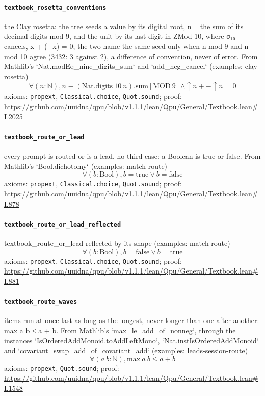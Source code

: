 \documentclass[11pt]{article}
\begin{document}
\paragraph{\texttt{textbook\_rosetta\_conventions}}
the Clay rosetta: the tree seeds a value by its digital root, n ≡ the sum of its decimal digits mod 9, and the unit by its last digit in ZMod 10, where σ₁₀ cancels, x + (−x) = 0; the two name the same seed only when n mod 9 and n mod 10 agree (3432: 3 against 2), a difference of convention, never of error. From Mathlib's `Nat.modEq\_nine\_digits\_sum` and `add\_neg\_cancel` (examples: clay-rosetta)
\[ \forall (n : \mathbb{N}), n \equiv (\mathrm{Nat.digits}\ 10\ n)\mathrm{.sum} [\mathrm{MOD}\ 9] \land \uparrow n + -\uparrow n = 0 \]
\noindent axioms: \texttt{propext}, \texttt{Classical.choice}, \texttt{Quot.sound}; proof: \url{https://github.com/uuidna/qpu/blob/v1.1.1/lean/Qpu/General/Textbook.lean\#L2025}

\paragraph{\texttt{textbook\_route\_or\_lead}}
every prompt is routed or is a lead, no third case: a Boolean is true or false. From Mathlib's `Bool.dichotomy` (examples: match-route)
\[ \forall (b : \mathrm{Bool}), b = \mathrm{true} \lor b = \mathrm{false} \]
\noindent axioms: \texttt{propext}, \texttt{Classical.choice}, \texttt{Quot.sound}; proof: \url{https://github.com/uuidna/qpu/blob/v1.1.1/lean/Qpu/General/Textbook.lean\#L878}

\paragraph{\texttt{textbook\_route\_or\_lead\_reflected}}
textbook\_route\_or\_lead reflected by its shape (examples: match-route)
\[ \forall (b : \mathrm{Bool}), b = \mathrm{false} \lor b = \mathrm{true} \]
\noindent axioms: \texttt{propext}, \texttt{Classical.choice}, \texttt{Quot.sound}; proof: \url{https://github.com/uuidna/qpu/blob/v1.1.1/lean/Qpu/General/Textbook.lean\#L881}

\paragraph{\texttt{textbook\_route\_waves}}
items run at once last as long as the longest, never longer than one after another: max a b ≤ a + b. From Mathlib's `max\_le\_add\_of\_nonneg`, through the instances `IsOrderedAddMonoid.toAddLeftMono`, `Nat.instIsOrderedAddMonoid` and `covariant\_swap\_add\_of\_covariant\_add` (examples: leads-session-route)
\[ \forall (a\ b : \mathbb{N}), \mathrm{max}\ a\ b \le a + b \]
\noindent axioms: \texttt{propext}, \texttt{Quot.sound}; proof: \url{https://github.com/uuidna/qpu/blob/v1.1.1/lean/Qpu/General/Textbook.lean\#L1548}
\end{document}
